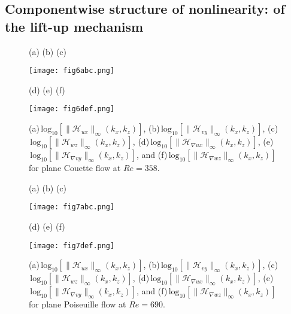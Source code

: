 \subsection{Componentwise structure of nonlinearity:  of the lift-up mechanism}

\label{subsec:componentwise_structure_nonlinear}



\begin{figure}
	\hspace{0.05\textwidth}(a) \hspace{0.28\textwidth} (b) \hspace{0.28\textwidth} (c)


\texttt{[image: fig6abc.png]}

	\hspace{0.05\textwidth}(d) \hspace{0.28\textwidth} (e) \hspace{0.28\textwidth} (f)

\texttt{[image: fig6def.png]}

    
    
    \caption{$\!$(a)$\,\text{log}_{10}[\|\mathcal{H}_{ux}\|_{\infty}(k_x,k_z)]$, (b)$\,\text{log}_{10}[\|\mathcal{H}_{vy}\|_{\infty}(k_x,k_z)]$, (c)$\,\text{log}_{10}[\|\mathcal{H}_{wz}\|_{\infty}(k_x,k_z)]$, (d)$\,\text{log}_{10}[\|\mathcal{H}_{\nabla {ux}}\|_{\infty}(k_x,k_z)]$, (e)$\,\text{log}_{10}[\|\mathcal{H}_{\nabla {vy}}\|_{\infty}(k_x,k_z)]$, and (f)$\,\text{log}_{10}[\|\mathcal{H}_{\nabla {wz}}\|_{\infty}(k_x,k_z)]$ for plane Couette flow at $Re=358$.}
    \label{fig:H_inf_no_grad_xu_yv_zw_cou}
\end{figure}


    
\begin{figure}
	\hspace{0.05\textwidth}(a) \hspace{0.28\textwidth} (b) \hspace{0.28\textwidth} (c)

     
\texttt{[image: fig7abc.png]}

	\hspace{0.05\textwidth}(d) \hspace{0.28\textwidth} (e) \hspace{0.28\textwidth} (f)

\texttt{[image: fig7def.png]}

    
    
    \caption{$\!$(a)$\,\text{log}_{10}[\|\mathcal{H}_{ux}\|_{\infty}(k_x,k_z)]$, (b)$\,\text{log}_{10}[\|\mathcal{H}_{vy}\|_{\infty}(k_x,k_z)]$, (c)$\,\text{log}_{10}[\|\mathcal{H}_{wz}\|_{\infty}(k_x,k_z)]$, (d)$\,\text{log}_{10}[\|\mathcal{H}_{\nabla {ux}}\|_{\infty}(k_x,k_z)]$, (e)$\,\text{log}_{10}[\|\mathcal{H}_{\nabla {vy}}\|_{\infty}(k_x,k_z)]$, and (f)\,$\text{log}_{10}[\|\mathcal{H}_{\nabla {wz}}\|_{\infty}(k_x,k_z)]$ for plane Poiseuille flow at $Re=690$.}
    \label{fig:H_inf_no_grad_xu_yv_zw_poi}
\end{figure}

